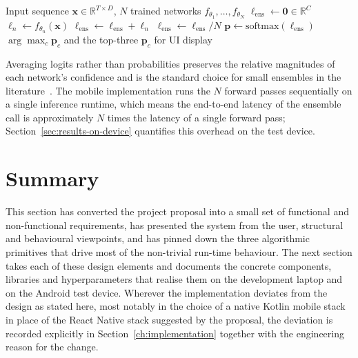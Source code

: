 \begin{algorithm}[!ht]
\caption{Logit-averaged ensemble inference (word classifier).}
\label{alg:design-ensemble}
\begin{algorithmic}[1]
\Require Input sequence
         $\mathbf{x} \in \mathbb{R}^{T \times D}$,
         $N$ trained networks
         $f_{\theta_1}, \dots, f_{\theta_N}$
\State $\boldsymbol\ell_{\text{ens}} \gets
       \mathbf{0} \in \mathbb{R}^{C}$
  \State $\boldsymbol\ell_n \gets f_{\theta_n}(\mathbf{x})$
  \State $\boldsymbol\ell_{\text{ens}} \gets
         \boldsymbol\ell_{\text{ens}} + \boldsymbol\ell_n$
\EndFor
\State $\boldsymbol\ell_{\text{ens}} \gets
       \boldsymbol\ell_{\text{ens}} / N$
\State $\mathbf{p} \gets
       \mathrm{softmax}(\boldsymbol\ell_{\text{ens}})$
\State \Return $\arg\max_c \mathbf{p}_c$ and the top-three
       $\mathbf{p}_c$ for UI display
\end{algorithmic}
\end{algorithm}

Averaging logits rather than probabilities preserves the relative
magnitudes of each network's confidence and is the standard choice
for small ensembles in the
literature~\cite{dietterich2000ensemble}. The mobile
implementation runs the $N$ forward passes sequentially on a
single inference runtime, which means the end-to-end latency of
the ensemble call is approximately $N$ times the latency of a
single forward pass; Section~\ref{sec:results-on-device}
quantifies this overhead on the test device.

\section{Summary}
\label{sec:design-summary}

This section has converted the project proposal into a small set
of functional and non-functional requirements, has presented the
system from the user, structural and behavioural viewpoints, and
has pinned down the three algorithmic primitives that drive most
of the non-trivial run-time behaviour. The next section takes each
of these design elements and documents the concrete components,
libraries and hyperparameters that realise them on the development
laptop and on the Android test device. Wherever the implementation
deviates from the design as stated here, most notably in the
choice of a native Kotlin mobile stack in place of the React
Native stack suggested by the proposal, the deviation is recorded
explicitly in Section~\ref{ch:implementation} together with the
engineering reason for the change.
